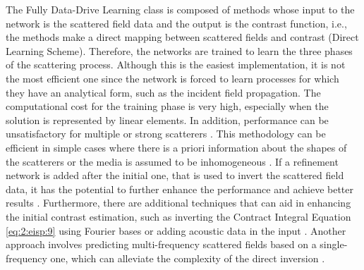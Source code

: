 		The Fully Data-Drive Learning class is composed of methods whose input to the network is the scattered field data and the output is the contrast function, i.e., the methods make a direct mapping between scattered fields and contrast (Direct Learning Scheme). Therefore, the networks are trained to learn the three phases of the scattering process. Although this is the easiest implementation, it is not the most efficient one since the network is forced to learn processes for which they have an analytical form, such as the incident field propagation. The computational cost for the training phase is very high, especially when the solution is represented by linear elements. In addition, performance can be unsatisfactory for multiple or strong scatterers \citep{chen2020review}. This methodology can be efficient in simple cases where there is a priori information about the shapes of the scatterers \citep{ran2019electromagnetic,fajardo2019phaseless} or the media is assumed to be inhomogeneous \citep{zhang2023solving}. If a refinement network is added after the initial one, that is used to invert the scattered field data, it has the potential to further enhance the performance and achieve better results \citep{yao2019two,song2021electromagnetic,chen2022tailored}. Furthermore, there are additional techniques that can aid in enhancing the initial contrast estimation, such as inverting the Contract Integral Equation \eqref{eq:2:eisp:9} using Fourier bases \citep{xu2022learning} or adding acoustic data in the input \citep{qin2022breast}. Another approach involves predicting multi-frequency scattered fields based on a single-frequency one, which can alleviate the complexity of the direct inversion \citep{zhang2023enhanced}.
			
